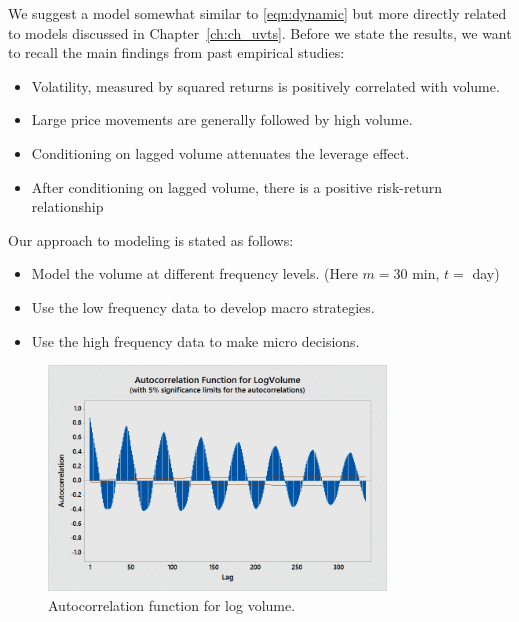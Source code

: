 We suggest a model somewhat similar to \eqref{eqn:dynamic} but more directly related to models discussed in Chapter~\ref{ch:ch_uvts}. Before we state the results, we want to recall the main findings from past empirical studies:
	\begin{itemize}
	\item Volatility, measured by squared returns is positively correlated with volume.
	\item Large price movements are generally followed by high volume.
	\item Conditioning on lagged volume attenuates the leverage effect.
	\item After conditioning on lagged volume, there is a positive risk-return relationship
	\end{itemize}
Our approach to modeling is stated as follows:
	\begin{itemize}
	\item Model the volume at different frequency levels. (Here $m=30 \text{ min}$, $t=$ day)
	\item Use the low frequency data to develop macro strategies.
	\item Use the high frequency data to make micro decisions.
	\end{itemize}

        \begin{figure}[!ht]
        \centering
        \includegraphics[width=0.8\textwidth]{chapters/chapter_stat_ts/figures/logvol.png}
        \caption{Autocorrelation function for log volume. \label{fig:logvolumeauto}}
        \end{figure}
        
